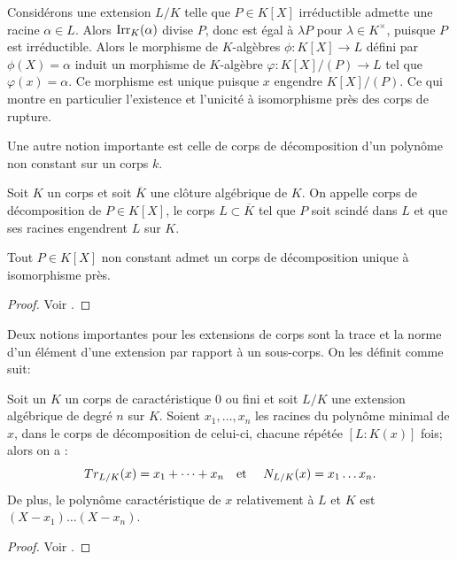 \documentclass[a4paper]{article} %
\numberwithin{section}{part}
\numberwithin{equation}{section}
\newcommand\Irr[2]{\textup{Irr}_{#1}(#2)}
\newcommand\etmath{\textup{\quad et \quad}}
\begin{document}
Considérons une extension $L/K$ telle que $P\in K[X]$ irréductible admette une 
racine $\alpha\in L$. Alors $\Irr{K}{\alpha}$ divise $P$, donc est égal à 
$\lambda P$ pour $\lambda\in K^{\times}$, puisque $P$ est irréductible. Alors 
le morphisme de $K$-algèbres $\phi : K[X] \to L$ défini par $\phi(X) = \alpha$ 
induit un morphisme de $K$-algèbre $\varphi : K[X]/(P) \to L$ tel que 
$\varphi(x) = \alpha$. Ce morphisme est unique puisque $x$ engendre $K[X]/(P)$. 
Ce qui montre en particulier l'existence et l'unicité à isomorphisme près des 
corps de rupture.\par
\vspace{0.3cm}
Une autre notion importante est celle de corps de décomposition d'un polynôme 
non constant sur un corps $k$.

\begin{defn}
\label{def:dec}
Soit $K$ un corps et soit $\overline{K}$ une clôture algébrique de $K$. On 
appelle corps de décomposition de $P\in K[X]$, le corps $L\subset\overline{K}$ 
tel que $P$ soit scindé dans $L$ et que ses racines engendrent $L$ sur $K$.
\end{defn}

\begin{thm}
\label{cor:dec}
Tout $P\in K[X]$ non constant admet un corps de décomposition unique à 
isomorphisme près.
\end{thm}
\begin{proof}
    Voir \cite[Chap III, th. 1.30]{Per}.
\end{proof}




Deux notions importantes pour les extensions de corps sont la trace et la norme
d'un élément d'une extension par rapport à un sous-corps. On les définit comme
suit:

\begin{defnp}
Soit un $K$ un corps de caractéristique 0 ou fini et soit $L/K$ une extension
algébrique de degré $n$ sur $K$. Soient $x_1,\dots, x_n$ les racines du polynôme
minimal de $x$, dans le corps de décomposition de celui-ci, chacune répétée 
$[L:K(x)]$ fois; alors on a :
\begin{equation}
Tr_{L/K}(x) = x_1 + \dots + x_n \etmath N_{L/K}(x) = x_1\dots x_n.
\end{equation}
De plus, le polynôme caractéristique de $x$ relativement à $L$ et $K$ est $(X -
x_1)\dots(X - x_n)$.
\end{defnp}
\begin{proof}
Voir \cite[p. 44, prop. 1]{Sam}.
\end{proof}
\end{document}
